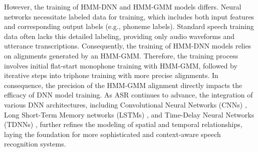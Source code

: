 However, the training of HMM-DNN and HMM-GMM models differs. Neural networks necessitate labeled data for training, which includes both input features and corresponding output labels (e.g., phoneme labels). Standard speech training data often lacks this detailed labeling, providing only audio waveforms and utterance transcriptions. Consequently, the training of HMM-DNN models relies on alignments generated by an HMM-GMM. Therefore, the training process involves initial flat-start monophone training with HMM-GMM, followed by iterative steps into triphone training with more precise alignments. In consequence, the precision of the HMM-GMM alignment directly impacts the efficacy of DNN model training. As ASR continues to advance, the integration of various DNN architectures, including Convolutional Neural Networks (CNNs) \cite{lang1990time}, Long Short-Term Memory networks (LSTMs) \cite{sak2014long}, and Time-Delay Neural Networks (TDNNs) \cite{waibel2013phoneme}, further refines the modeling of spatial and temporal relationships, laying the foundation for more sophisticated and context-aware speech recognition systems.

